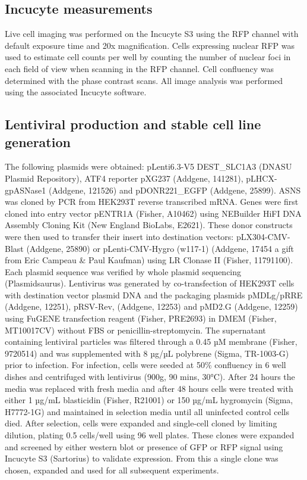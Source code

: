 \subsection{Incucyte measurements}
Live cell imaging was performed on the Incucyte S3 using the RFP channel with default exposure time and 20x magnification.
Cells expressing nuclear RFP was used to estimate cell counts per well by counting the number of nuclear foci in each field of view when scanning in the RFP channel.
Cell confluency was determined with the phase contrast scans.
All image analysis was performed using the associated Incucyte software.


\subsection{Lentiviral production and stable cell line generation}
The following plasmids were obtained: pLenti6.3-V5 DEST\_SLC1A3 (DNASU Plasmid Repository), ATF4 reporter pXG237 (Addgene, 141281), pLHCX-gpASNase1 (Addgene, 121526) and pDONR221\_EGFP (Addgene, 25899).
ASNS was cloned by PCR from HEK293T reverse transcribed mRNA.
Genes were first cloned into entry vector pENTR1A (Fisher, A10462) using NEBuilder HiFI DNA Assembly Cloning Kit (New England BioLabs, E2621).
These donor constructs were then used to transfer their insert into destination vectors: pLX304-CMV-Blast (Addgene, 25890) or pLenti-CMV-Hygro (w117-1) (Addgene, 17454 a gift from Eric Campeau \& Paul Kaufman) using LR Clonase II (Fisher, 11791100).
Each plasmid sequence was verified by whole plasmid sequencing (Plasmidsaurus).
Lentivirus was generated by co-transfection of HEK293T cells with destination vector plasmid DNA and the packaging plasmids pMDLg/pRRE (Addgene, 12251), pRSV-Rev, (Addgene, 12253) and pMD2.G (Addgene, 12259) using FuGENE transfection reagent (Fisher, PRE2693) in DMEM (Fisher, MT10017CV) without FBS or penicillin-streptomycin.
The supernatant containing lentiviral particles was filtered through a 0.45 µM membrane (Fisher, 9720514) and was supplemented with 8 µg/µL polybrene (Sigma, TR-1003-G) prior to infection.
For infection, cells were seeded at 50\% confluency in 6 well dishes and centrifuged with lentivirus (900g, 90 mins, 30°C).
After 24 hours the media was replaced with fresh media and after 48 hours cells were treated with either 1 µg/mL blasticidin (Fisher, R21001) or 150 µg/mL hygromycin (Sigma, H7772-1G) and maintained in selection media until all uninfected control cells died.
After selection, cells were expanded and single-cell cloned by limiting dilution, plating 0.5 cells/well using 96 well plates.
These clones were expanded and screened by either western blot or presence of GFP or RFP signal using Incucyte S3 (Sartorius) to validate expression.
From this a single clone was chosen, expanded and used for all subsequent experiments.


